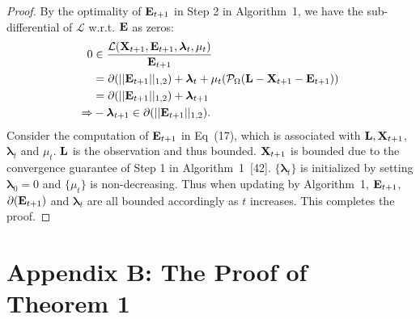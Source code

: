 \documentclass[10pt,twocolumn,letterpaper]{article}
\newtheorem{theorem}{Theorem}
\newcommand\mycomment[1]{}
\def\calP{\mathcal{P}}
\def\bE{{\bf E}}
\def\blambda{{\bm \lambda}}
\def\calL{{\mathcal{L}}}
\def\bL{{\bf L}}
\def\bX{{\bf X}}
\def\bX{{\bf X}}
\begin{document}
\begin{proof}
  By the optimality of $\bE_{t+1}$ in Step 2 in Algorithm~1, we have the sub-differential of $\calL$ w.r.t. $\bE$ as zeros:
  {\small{
  \begin{align}
  \label{eq:derivatives_calL_E}
    0 & \in \frac{\calL(\bX_{t+1}, \bE_{t+1}, \blambda_{t}, \mu_{t})}{\bE_{t+1}} \nonumber \\
      & = \partial(|| \bE_{t+1} ||_{1,2}) + \blambda_{t} + \mu_{t} (\calP_{\Omega} (\bL - \bX_{t+1} - \bE_{t+1})) \nonumber \\
      & = \partial(|| \bE_{t+1} ||_{1,2}) + \blambda_{t+1}   \nonumber \\
    \Rightarrow & -\blambda_{t+1} \in \partial(|| \bE_{t+1} ||_{1,2})  .
  \end{align}
  }}
  \noindent
  Consider the computation of $\bE_{t+1}$ in Eq~(17), which is associated with $\bL, \bX_{t+1}$, $\blambda_{t}$ and $\mu_{t}$.
  $\bL$ is the observation and thus bounded.
  $\bX_{t+1}$ is bounded due to the convergence guarantee of Step 1 in Algorithm~1~[42].
  $\{ \blambda_{t} \}$ is initialized by setting $\blambda_{0} = 0$ and $\{ \mu_{t} \}$ is non-decreasing.
  Thus when updating by Algorithm~1, $\bE_{t+1}$, $\partial(\bE_{t+1})$ and $\blambda_{t}$ are all bounded accordingly as $t$ increases.
  This completes the proof.
\end{proof}



\section{Appendix B: The Proof of Theorem 1}

\mycomment{
\begin{theorem}\label{theorem:alm_convergence}
  Given that the sequence $\{ \blambda_{k} \}$ is bounded, any accumulation point $(\bX^*, \bE^*)$ of Algorithm~1 is a stationary point.
\end{theorem}
}
\end{document}

